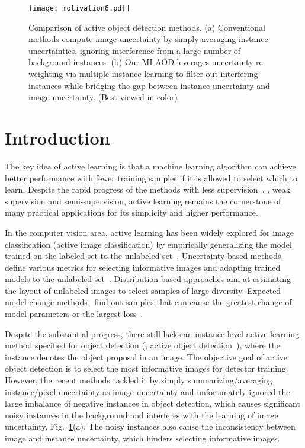 \documentclass[final]{cvpr}
\begin{document}
\begin{figure}[t]
    \centering
    \texttt{[image: motivation6.pdf]}
    \caption{Comparison of active object detection methods. (a) Conventional methods compute image uncertainty by simply averaging instance uncertainties, ignoring interference from a large number of background instances. (b) Our MI-AOD leverages uncertainty re-weighting via multiple instance learning to filter out interfering instances while bridging the gap between instance uncertainty and image uncertainty. (Best viewed in color)
    }
    \label{fig:motivation}
\end{figure}

\section{Introduction}

The key idea of active learning is that a machine learning algorithm can achieve better performance with fewer training samples if it is allowed to select which to learn. Despite the rapid progress of the methods with less supervision~\cite{Lbh2021TIP,Lbh2021CVPR}, \eg, weak supervision and semi-supervision, active learning remains the cornerstone of many practical applications for its simplicity and higher performance.

In the computer vision area, active learning has been widely explored for image classification (active image classification) by empirically generalizing the model trained on the labeled set to the unlabeled set~\cite{DeepBayes17, CoreSet18, SelfPaced18,CostEffective17,PowerEnsem18,OpenSet2019,SelfPaced2020,UncertaintyGraph2020,VAAL19}.
Uncertainty-based methods define various metrics for selecting informative images and adapting trained models to the unlabeled set~\cite{DeepBayes17}. Distribution-based approaches \cite{CoreSet18, CDAL20} aim at estimating the layout of unlabeled images to select samples of large diversity. Expected model change methods~\cite{SelectInfluent14, ActiveContinuous16} find out samples that can cause the greatest change of model parameters or the largest loss~\cite{LearningLoss19}.

Despite the substantial progress, there still lacks an instance-level active learning method specified for object detection (\ie, active object detection~\cite{LearningLoss19, SRAAL20, PedesDetect19}), where the instance denotes the object proposal in an image.
The objective goal of active object detection is to select the most informative images for detector training. However, the recent methods tackled it by simply summarizing/averaging instance/pixel uncertainty as image uncertainty and unfortunately ignored the large imbalance of negative instances in object detection, which causes significant noisy instances in the background and interferes with the learning of image uncertainty, Fig.~\ref{fig:motivation}(a).
The noisy instances also cause the inconsistency between image and instance uncertainty, which hinders selecting informative images.
\end{document}
